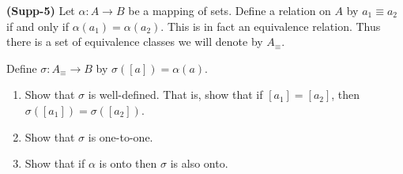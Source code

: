 \documentclass[12pt]{article}
\begin{document}
\newpage
\textbf{(Supp-5)} Let $\alpha\colon A\to B$ be a mapping of sets. Define a relation on $A$ by $a_1\equiv a_2$ if and only if $\alpha(a_1)=\alpha(a_2)$. This is in fact an equivalence relation. Thus there is a set of equivalence classes we will denote by $A_\equiv$. 

Define $\sigma\colon A_\equiv \to B$ by $\sigma([a]) = \alpha(a)$.
\begin{enumerate}[label=(\alph*)]
	\item Show that $\sigma$ is well-defined. That is, show that if $[a_1]=[a_2]$, then $\sigma([a_1])=\sigma([a_2])$.\vfill
	\item Show that $\sigma$ is one-to-one.\vfill 
	\item Show that if $\alpha$ is onto then $\sigma$ is also onto.\vfill
\end{enumerate}



	
\end{document}
